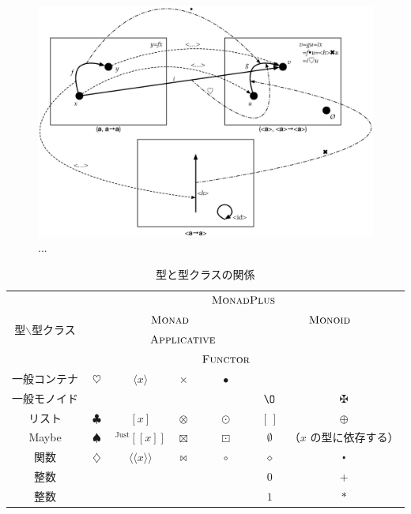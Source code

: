 \documentclass[a4paper,twocolumn]{jsbook}
\def\[{\left[\!\left[}
\def\]{\right]\!\right]}
\newcommand{\Langle}{\langle\!\langle}
\newcommand{\Rangle}{\rangle\!\rangle}
\newcommand{\mEmptyList}{{[\,]}}
\newcommand{\mNothing}{\emptyset}
\newcommand{\mZero}{\O}
\newcommand{\mAnonParam}{\diamond}
\DeclareMathOperator{\mAppend}{\oplus}
\DeclareMathOperator{\mAppMap}{\times}
\DeclareMathOperator{\mAppMapFunc}{\bowtie}
\DeclareMathOperator{\mAppMapList}{\otimes}
\DeclareMathOperator{\mAppMapMaybe}{\boxtimes}
\DeclareMathOperator{\mBind}{\heartsuit}
\DeclareMathOperator{\mBindFunc}{\diamondsuit}
\DeclareMathOperator{\mBindList}{\clubsuit}
\DeclareMathOperator{\mBindMaybe}{\spadesuit}
\DeclareMathOperator{\mComp}{\centerdot}
\DeclareMathOperator{\mMap}{\bullet}
\DeclareMathOperator{\mMapFunc}{\circ}
\DeclareMathOperator{\mMapList}{\odot}
\DeclareMathOperator{\mMapMaybe}{\boxdot}
\DeclareMathOperator{\mPlus}{\maltese}
\newcommand{\mGenericValueConstructor}[1]{\mathrm{#1}}
\newcommand{\mGenericWith}[2]{{}^\mGenericValueConstructor{#1}\[#2\]}
\newcommand{\mJustWith}[1]{\mGenericWith{Just}{#1}}
\newcommand{\mFuncWith}[1]{\Langle#1\Rangle}
\newcommand{\mListWith}[1]{\left[#1\right]}
\newcommand{\mPureWith}[1]{\langle#1\rangle}
\newcommand{\mGenericTypeClass}[1]{\textsc{#1}} %
\newcommand{\mApplicativeTypeClass}{\mGenericTypeClass{Applicative}}
\newcommand{\mFunctorTypeClass}{\mGenericTypeClass{Functor}}
\newcommand{\mMonadTypeClass}{\mGenericTypeClass{Monad}}
\newcommand{\mMonadPlusTypeClass}{\mGenericTypeClass{MonadPlus}}
\newcommand{\mMonoidTypeClass}{\mGenericTypeClass{Monoid}}
\begin{document}
\begin{figure}
\begin{center}
\includegraphics[width=150mm]{fig/functor.eps}
\end{center}
\caption{...}
\label{fig:functor}
\end{figure}





\begin{table}
\label{tab:monadplus}
\caption{型と型クラスの関係}
\begin{center}
\begin{tabular}{||c||c|c|c|c|c|c||}
\hline
\multirow{4}{*}{型$\backslash$型クラス}
  &\multicolumn{6}{|c||}{$\mMonadPlusTypeClass$}\\
\cline{2-7}
\multirow{3}{*}{}
  &\multicolumn{4}{|c|}{$\mMonadTypeClass$}
  &\multicolumn{2}{|c||}{$\mMonoidTypeClass$}\\
\cline{3-5}
\multirow{2}{*}{}
  &
  &\multicolumn{3}{|c|}{$\mApplicativeTypeClass$}
  &\multicolumn{2}{|c||}{}\\
\cline{5-5}
\multirow{1}{*}{}
  &
  &\multicolumn{2}{|c|}{}
  &$\mFunctorTypeClass$
  &\multicolumn{2}{|c||}{}\\
\hline\hline
一般コンテナ
  &$\mBind$
  &$\mPureWith{x}$
  &$\mAppMap$
  &$\mMap$
  &
  &\\
\hline
一般モノイド
  &
  &
  &
  &
  &$\mZero$
  &$\mPlus$\\
\hline
リスト
  &$\mBindList$
  &$\mListWith{x}$
  &$\mAppMapList$
  &$\mMapList$
  &$\mEmptyList$
  &$\mAppend$\\
\hline
Maybe
  &$\mBindMaybe$
  &$\mJustWith{x}$
  &$\mAppMapMaybe$
  &$\mMapMaybe$
  &$\mNothing$
  &（$x$ の型に依存する）\\
\hline
関数
  &$\mBindFunc$
  &$\mFuncWith{x}$
  &$\mAppMapFunc$
  &$\mMapFunc$
  &$\mAnonParam$
  &$\mComp$\\
\hline
整数
  &
  &
  &
  &
  &$0$
  &$+$\\
\hline  
整数
  &
  &
  &
  &
  &$1$
  &$*$\\
\hline  
\end{tabular}
\end{center}
\end{table}
\end{document}
